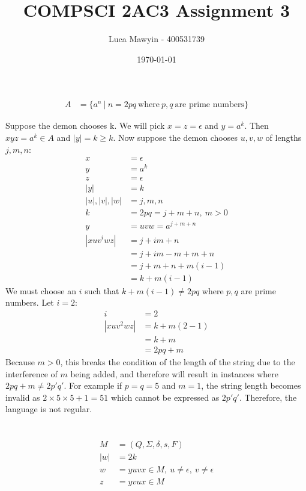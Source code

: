 \documentclass[letterpaper]{article}
\title{COMPSCI 2AC3 Assignment 3}
\author{Luca Mawyin - 400531739}
\date{\today}
\theoremstyle{plain}
\theoremstyle{definition}
\theoremstyle{remark}
\begin{document}
\maketitle

\section{}

\begin{align*}
    A &= \{a^n~|~n=2pq~\text{where}~p,q~\text{are prime numbers}\}
\end{align*}

Suppose the demon chooses k. We will pick $x=z=\epsilon$ and $y=a^k$. Then $xyz=a^k\in{A}$ and $|y|=k\geq{k}$. Now suppose the demon chooses $u,v,w$ of lengths $j,m,n$:
\begin{align*}
    x&=\epsilon\\
    y&=a^k\\
    z&=\epsilon\\
    |y|&=k\\
    |u|,|v|,|w|&=j,m,n\\
    k&=2pq=j+m+n,~m>0\\
    y&=uvw=a^{j+m+n}\\
    |xuv^iwz|&=j+im+n\\
    &=j+im-m+m+n\\
    &=j+m+n+m(i-1)\\
    &=k+m(i-1)
\end{align*}
We must choose an $i$ such that $k+m(i-1)\neq{2pq}$ where $p,q$ are prime numbers. Let $i=2$:
\begin{align*}
    i&=2\\
    |xuv^2wz|&=k+m(2-1)\\
    &=k+m\\
    &=2pq+m
\end{align*}
Because $m>0$, this breaks the condition of the length of the string due to the interference of $m$ being added, and therefore will result in instances where $2pq+m\neq2p'q'$. For example if $p=q=5$ and $m=1$, the string length becomes invalid as $2\times5\times5+1=51$ which cannot be expressed as $2p'q'$. Therefore, the language is not regular.

\newpage

\section{}

\begin{align*}
    M&=(Q,\Sigma,\delta,s,F)\\
    |w|&=2k\\
    w&=yuvx\in{M},~u\neq\epsilon,~v\neq\epsilon\\
    z&=yvux\in{M}
\end{align*}
\end{document}
